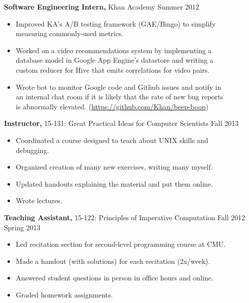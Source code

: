 \documentclass[margin]{res}
\begin{document}
\begin{resume}
  \textbf{Software Engineering Intern,} Khan Academy \hfill Summer 2012
  \begin{itemize} \itemsep -2pt %
  \item Improved KA's A/B testing framework (GAE/Bingo) to simplify\\
      measuring commonly-used metrics.
  \item Worked on a video recommendations system by implementing a \\
      database model in Google App Engine's datastore and writing a \\
      custom reducer for Hive that emits correlations for video pairs.
  \item Wrote bot to monitor Google code and Github issues and notify in \\
      an internal chat room if it is likely that the rate of new bug reports \\
      is abnormally elevated.
      (\href{https://github.com/Khan/beep-boop}
            {https://github.com/Khan/beep-boop})
  \end{itemize}

  \textbf{Instructor,} 15-131: Great Practical Ideas for Computer Scientists
    \hfill Fall 2013
  \begin{itemize} \itemsep -2pt
    \item Coordinated a course designed to teach about UNIX skills and \\
        debugging.
    \item Organized creation of many new exercises, writing many myself.
    \item Updated handouts explaining the material and put them online.
    \item Wrote lectures.
  \end{itemize}

  \textbf{Teaching Assistant,} 15-122: Principles of Imperative Computation
    \hfill Fall 2012\\ \hphantom{1em} \hfill Spring 2013

  \vspace{-1em}\vspace{-1ex}
  \begin{itemize} \itemsep -2pt
    \item Led recitation section for second-level programming course at CMU.
    \item Made a handout (with solutions) for each recitation (2x/week).
    \item Answered student questions in person in office hours and online.
    \item Graded homework assignments.
  \end{itemize}


\end{resume}
\end{document}

